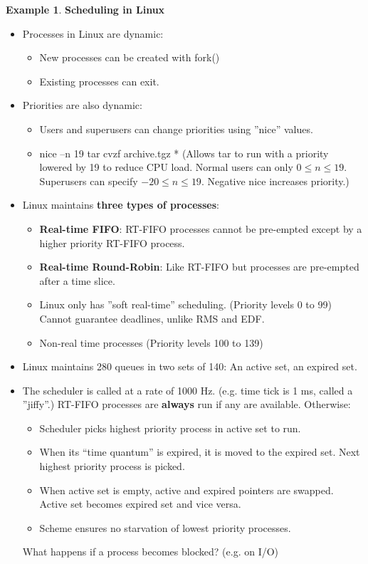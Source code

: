 \documentclass[12pt,a4paper]{article}
\theoremstyle{definition}
\newtheorem{example}{Example}[section]
\newenvironment{myitemize}
{ \begin{itemize}
    \setlength{\itemsep}{5pt}
    \setlength{\parskip}{0pt}
    \setlength{\parsep}{0pt}     }
{ \end{itemize}                  }
\begin{document}
\begin{example}{\textbf{Scheduling in Linux}}
	\begin{myitemize}
		\item Processes in Linux are dynamic:
		\begin{myitemize}
			\item New processes can be created with \textsf{fork()}
			\item Existing processes can exit.
		\end{myitemize}
		\item Priorities are also dynamic:
		\begin{myitemize}
			\item Users and superusers can change priorities using ''nice'' values.
			\item \textsf{nice –n 19 tar cvzf archive.tgz *} (Allows tar to run with a priority lowered by 19 to reduce CPU load. Normal users can only $0\leq n \leq 19$. Superusers can specify $-20\leq n \leq 19$. Negative nice increases priority.)
		\end{myitemize}
		\item Linux maintains \textbf{three types of processes}:
		\begin{myitemize}
			\item \textbf{Real-time FIFO}: \textsf{RT-FIFO} processes cannot be pre-empted except by a higher priority \textsf{RT-FIFO} process.
			\item \textbf{Real-time Round-Robin}: Like \textsf{RT-FIFO} but processes are pre-empted after a time slice.
			\item Linux only has ''soft real-time'' scheduling. (Priority levels 0 to 99) Cannot guarantee deadlines, unlike \textsf{RMS} and \textsf{EDF}. 
			\item Non-real time processes (Priority levels 100 to 139)
		\end{myitemize}
		\item Linux maintains 280 queues in two sets of 140: An active set, an expired set.
		\item The scheduler is called at a rate of 1000 Hz. (e.g. time tick is 1 ms, called a ''jiffy''.) \textsf{RT-FIFO} processes are \textbf{always} run if any are available. Otherwise:
		\begin{myitemize}
			\item Scheduler picks highest priority process in active set to run.
			\item When its “time quantum” is expired, it is moved to the expired set. Next highest priority process is picked.
			\item When active set is empty, active and expired pointers are swapped. Active set becomes expired set and vice versa.
			\item Scheme ensures no starvation of lowest priority processes.
		\end{myitemize}
		\begin{tcolorbox}
			\textsf{What happens if a process becomes blocked? (e.g. on I/O)}
			

\end{tcolorbox}
\end{myitemize}
\end{example}
\end{document}
